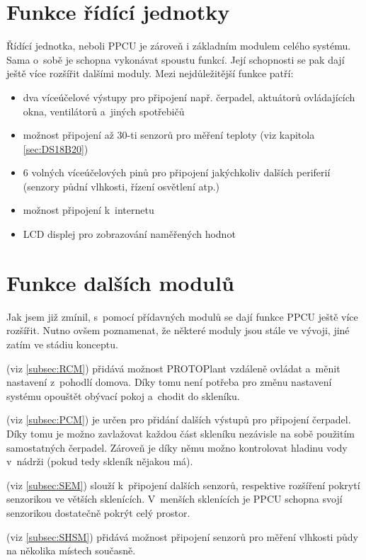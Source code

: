 \section{Funkce řídící jednotky}
Řídící jednotka, neboli PPCU je zároveň i základním modulem celého systému.
Sama o~sobě je schopna vykonávat spoustu funkcí.
Její schopnosti se pak dají ještě více rozšířit dalšími moduly.
Mezi nejdůležitější funkce patří:
\begin{itemize}
    \item dva víceúčelové výstupy pro připojení např. čerpadel, aktuátorů ovláda\-jí\-cích okna, ventilátorů a~jiných spotřebičů
    \item možnost připojení až 30-ti senzorů pro měření teploty (viz kapitola \ref{sec:DS18B20})
    \item 6 volných víceúčelových pinů pro připojení jakýchkoliv dalších periferií (senzory půdní vlhkosti, řízení osvětlení atp.)
    \item možnost připojení k~internetu
    \item LCD displej pro zobrazování naměřených hodnot
\end{itemize}

\section{Funkce dalších modulů}
Jak jsem již zmínil, s~pomocí přídavných modulů se dají funkce PPCU ještě více rozšířit.
Nutno ovšem poznamenat, že některé moduly jsou stále ve vývoji, jiné zatím ve stádiu konceptu.
\newline

\noindent{} (viz \autoref{subsec:RCM}) přidává možnost PROTOPlant vzdáleně ovládat a~měnit nastavení z~pohodlí domova.
Díky tomu není potřeba pro změnu nastavení systému opouštět obývací pokoj a~chodit do skleníku. \newline

\noindent{} (viz \autoref{subsec:PCM}) je určen pro přidání dalších výstupů pro připojení čerpadel.
Díky tomu je možno zavlažovat každou část skleníku nezávisle na sobě použitím samostatných čerpadel. 
Zároveň je díky němu možno kontrolovat hladinu vody v~nádrži (pokud tedy skleník nějakou má).\newline

\noindent{} (viz \autoref{subsec:SEM}) slouží k~připojení dalších senzorů, respektive rozšíření pokrytí senzorikou ve větších sklenících.
V~menších sklenících je PPCU schopna svojí senzorikou dostatečně pokrýt celý prostor.\newline

\noindent{} (viz \autoref{subsec:SHSM}) přidává možnost připojení senzorů pro měření vlhkosti půdy na několika místech současně.\newline

\newpage